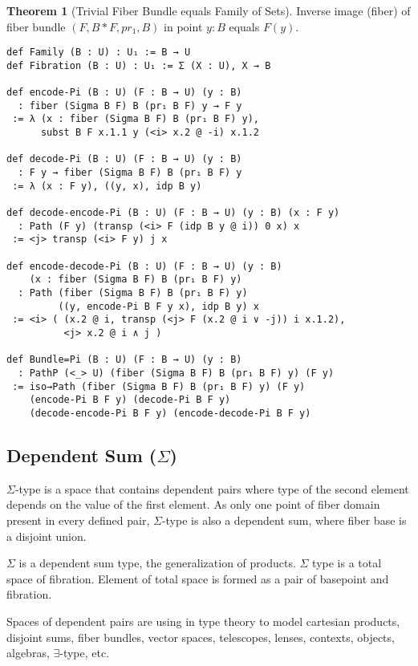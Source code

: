 \documentclass{article}
\theoremstyle{definition}
\newtheorem{theorem}{Theorem}
\begin{document}
\begin{theorem}[Trivial Fiber Bundle equals Family of Sets]
Inverse image (fiber) of fiber bundle $(F,B*F,pr_1,B)$ in point $y:B$ equals $F(y)$.
\begin{lstlisting}[mathescape=true]
def Family (B : U) : U₁ := B → U
def Fibration (B : U) : U₁ := Σ (X : U), X → B

def encode-Pi (B : U) (F : B → U) (y : B)
  : fiber (Sigma B F) B (pr₁ B F) y → F y
 := λ (x : fiber (Sigma B F) B (pr₁ B F) y),
      subst B F x.1.1 y (<i> x.2 @ -i) x.1.2

def decode-Pi (B : U) (F : B → U) (y : B)
  : F y → fiber (Sigma B F) B (pr₁ B F) y
 := λ (x : F y), ((y, x), idp B y)

def decode-encode-Pi (B : U) (F : B → U) (y : B) (x : F y)
  : Path (F y) (transp (<i> F (idp B y @ i)) 0 x) x
 := <j> transp (<i> F y) j x

def encode-decode-Pi (B : U) (F : B → U) (y : B)
    (x : fiber (Sigma B F) B (pr₁ B F) y)
  : Path (fiber (Sigma B F) B (pr₁ B F) y)
         ((y, encode-Pi B F y x), idp B y) x
 := <i> ( (x.2 @ i, transp (<j> F (x.2 @ i ∨ -j)) i x.1.2),
          <j> x.2 @ i ∧ j )

def Bundle=Pi (B : U) (F : B → U) (y : B)
  : PathP (<_> U) (fiber (Sigma B F) B (pr₁ B F) y) (F y)
 := iso→Path (fiber (Sigma B F) B (pr₁ B F) y) (F y)
    (encode-Pi B F y) (decode-Pi B F y)
    (decode-encode-Pi B F y) (encode-decode-Pi B F y)
\end{lstlisting}
\end{theorem}

\subsection{Dependent Sum ($\Sigma$)}
$\Sigma$-type is a space that contains dependent pairs
where type of the second element depends on the value
of the first element. As only one point of fiber domain
present in every defined pair, $\Sigma$-type is also a dependent sum,
where fiber base is a disjoint union.

$\Sigma$ is a dependent sum type, the generalization of products.
$\Sigma$ type is a total space of fibration. Element of total
space is formed as a pair of basepoint and fibration.

Spaces of dependent pairs are using in type theory to model
cartesian products, disjoint sums, fiber bundles, vector spaces,
telescopes, lenses, contexts, objects, algebras, $\exists$-type, etc.
\end{document}
